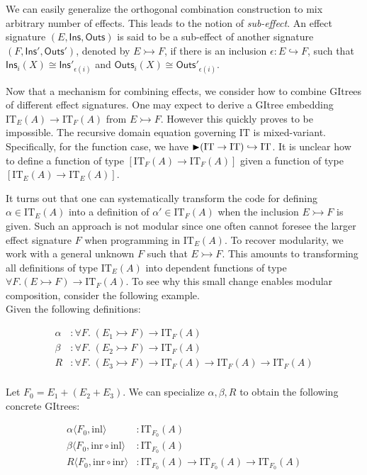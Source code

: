 \documentclass{article}
\theoremstyle{definition}
\theoremstyle{plain}
\theoremstyle{remark}
\newcommand{\subeff}{\rightarrowtail}
\newcommand{\Ins}{\mathsf{Ins}}
\newcommand{\Outs}{\mathsf{Outs}}
\newcommand{\inl}{\mathrm{inl}}
\newcommand{\inr}{\mathrm{inr}}
\newcommand{\IT}{\mathrm{IT}}
\begin{document}
We can easily generalize the orthogonal combination construction to mix arbitrary number of effects.
This leads to the notion of \emph{sub-effect}.
An effect signature \((E, \Ins, \Outs)\) is said to be a sub-effect of another signature \((F, \Ins', \Outs')\), denoted by \(E\subeff F\),
if there is an inclusion \(\epsilon : E \hookrightarrow F\), such that \(\Ins_i(X) \cong \Ins'_{\epsilon(i)}\) and \(\Outs_i(X) \cong \Outs'_{\epsilon(i)}\).\par

Now that a mechanism for combining effects, we consider how to combine GItrees of different effect signatures.
One may expect to derive a GItree embedding \(\IT_E(A) \to \IT_F(A)\) from \(E\subeff F\).
However this quickly proves to be impossible.
The recursive domain equation governing \(\IT\) is mixed-variant. Specifically, for the function case, we have \(\latert (\IT \to \IT) \hookrightarrow \IT\).
It is unclear how to define a function of type \([\IT_F(A) \to \IT_F(A)]\) given a function of type \([\IT_E(A) \to \IT_E(A)]\).\par


It turns out that one can systematically transform the code for defining \(\alpha \in \IT_E(A)\) into a definition of \(\alpha' \in \IT_F(A)\) when the inclusion \(E\subeff F\) is given.
Such an approach is not modular since one often cannot foresee the larger effect signature \(F\) when programming in \(\IT_E(A)\).
To recover modularity, we work with a general unknown \(F\) such that \(E\subeff F\).
This amounts to transforming all definitions of type \(\IT_E(A)\) into dependent functions of type \(\forall F . (E\subeff F) \to \IT_F(A)\).
To see why this small change enables modular composition, consider the following example.\\

Given the following definitions:

\begin{align*}
  \alpha &: \forall F .\; (E_1\subeff F) \to \IT_F(A) \\
  \beta &: \forall F .\; (E_2\subeff F) \to \IT_F(A) \\
  R &: \forall F .\; (E_3\subeff F) \to \IT_F(A) \to \IT_F(A) \to \IT_F(A) \\
\end{align*}

Let \(F_0 = E_1 + (E_2 + E_3)\). We can specialize \(\alpha,\beta,R\) to obtain the following concrete GItrees:

\begin{align*}
  \alpha \langle F_0, \inl \rangle & : \IT_{F_0}(A) \\
  \beta \langle F_0, \inr \circ \inl \rangle & : \IT_{F_0}(A) \\
  R \langle F_0, \inr \circ \inr \rangle & : \IT_{F_0}(A) \to \IT_{F_0}(A) \to \IT_{F_0}(A) \\
\end{align*}
\end{document}
